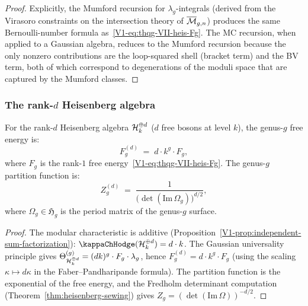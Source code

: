 \begin{proof}
Explicitly, the Mumford recursion for $\lambda_g$-integrals
(derived from the Virasoro constraints on the intersection
theory of $\overline{\mathcal{M}}_{g,n}$) produces the same
Bernoulli-number formula as~\eqref{V1-eq:thqg-VII-heis-Fg}.
The MC recursion, when applied to a Gaussian algebra, reduces to
the Mumford recursion because the only nonzero contributions are
the loop-squared shell (bracket term) and the BV term, both of
which correspond to degenerations of the moduli space that are
captured by the Mumford classes.
\end{proof}

\subsubsection{The rank-$d$ Heisenberg algebra}

\begin{corollary}
For the rank-$d$ Heisenberg algebra $\mathcal{H}_k^{\oplus d}$
\textup{(}$d$ free bosons at level $k$\textup{)}, the genus-$g$
free energy is:
\begin{equation}%
F_g^{(d)}
\;=\;
d \cdot k^g \cdot F_g,
\end{equation}
where $F_g$ is the rank-$1$ free energy~\eqref{V1-eq:thqg-VII-heis-Fg}.
The genus-$g$ partition function is:
\begin{equation}%
Z_g^{(d)}
\;=\;
\frac{1}{\bigl(\det(\mathrm{Im}\,\Omega_g)\bigr)^{d/2}},
\end{equation}
where $\Omega_g \in \mathfrak{H}_g$ is the period matrix of
the genus-$g$ surface.
\end{corollary}

\begin{proof}
The modular characteristic is additive
(Proposition~\ref{V1-prop:independent-sum-factorization}):
$\kappaChHodge(\cH_k^{\oplus d}) = d \cdot k$. The Gaussian
universality principle gives $\Theta^{(g)}_{\mathcal{H}_k^{\oplus d}}
= (dk)^g \cdot F_g \cdot \lambda_g$, hence
$F_g^{(d)} = d \cdot k^g \cdot F_g$ (using the scaling
$\kappa \mapsto d\kappa$ in the Faber--Pandharipande formula).
The partition function is the exponential of the free energy,
and the Fredholm determinant computation
(Theorem~\ref{thm:heisenberg-sewing})
gives $Z_g = (\det(\mathrm{Im}\,\Omega))^{-d/2}$.
\end{proof}

